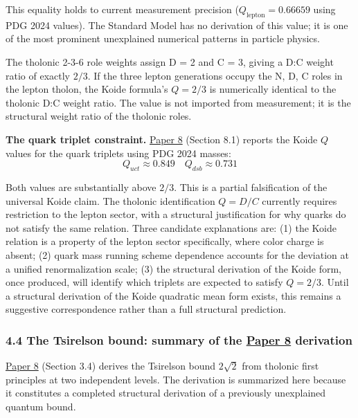 \documentclass[12pt]{article}
\begin{document}
This equality holds to current measurement precision
(\(Q_{\text{lepton}} = 0.66659\) using PDG 2024 values). The Standard
Model has no derivation of this value; it is one of the most prominent
unexplained numerical patterns in particle physics.

The tholonic 2-3-6 role weights assign D = 2 and C = 3, giving a D:C
weight ratio of exactly \(2/3\). If the three lepton generations occupy
the N, D, C roles in the lepton tholon, the Koide formula's \(Q = 2/3\)
is numerically identical to the tholonic D:C weight ratio. The value is
not imported from measurement; it is the structural weight ratio of the
tholonic roles.

\textbf{The quark triplet constraint.}
\href{https://github.com/baardev/truevalue/blob/main/docnav/Research/papers/8_atom-as-tholon-measurable-phenomena/8_atom-as-tholon-measurable-phenomena.pdf}{Paper
8} (Section 8.1) reports the Koide \(Q\) values for the quark triplets
using PDG 2024 masses:
\[Q_{uct} \approx 0.849 \quad Q_{dsb} \approx 0.731\]

Both values are substantially above \(2/3\). This is a partial
falsification of the universal Koide claim. The tholonic identification
\(Q = D/C\) currently requires restriction to the lepton sector, with a
structural justification for why quarks do not satisfy the same
relation. Three candidate explanations are: (1) the Koide relation is a
property of the lepton sector specifically, where color charge is
absent; (2) quark mass running scheme dependence accounts for the
deviation at a unified renormalization scale; (3) the structural
derivation of the Koide form, once produced, will identify which
triplets are expected to satisfy \(Q = 2/3\). Until a structural
derivation of the Koide quadratic mean form exists, this remains a
suggestive correspondence rather than a full structural prediction.

\subsubsection{\texorpdfstring{4.4 The Tsirelson bound: summary of the
\href{https://github.com/baardev/truevalue/blob/main/docnav/Research/papers/8_atom-as-tholon-measurable-phenomena/8_atom-as-tholon-measurable-phenomena.pdf}{Paper
8}
derivation}{4.4 The Tsirelson bound: summary of the Paper 8 derivation}}\label{the-tsirelson-bound-summary-of-the-paper-8-derivation}

\href{https://github.com/baardev/truevalue/blob/main/docnav/Research/papers/8_atom-as-tholon-measurable-phenomena/8_atom-as-tholon-measurable-phenomena.pdf}{Paper
8} (Section 3.4) derives the Tsirelson bound \(2\sqrt{2}\) from tholonic
first principles at two independent levels. The derivation is summarized
here because it constitutes a completed structural derivation of a
previously unexplained quantum bound.
\end{document}
